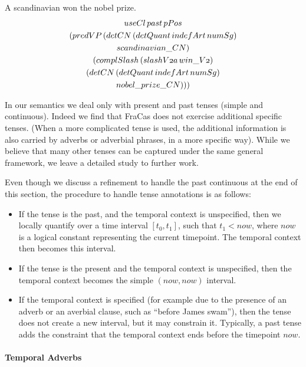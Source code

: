 \documentclass[a4paper,11pt]{article}
\newcommand\onelingex[1]{\begin{lingex}\item #1 \end{lingex}}
\begin{document}
\onelingex{A scandinavian won the nobel prize.\label{ex:nobel}
\\
{\small\begin{multline*}
\mathnormal{useCl}\, \mathnormal{past}\, \mathnormal{pPos}\\ (\mathnormal{predVP}\, (\mathnormal{detCN}\, (\mathnormal{detQuant}\, \mathnormal{indefArt}\, \mathnormal{numSg})\\ \mathnormal{scandinavian\_CN})\\ (\mathnormal{complSlash}\, (\mathnormal{slashV2a}\, \mathnormal{win\_V2})\\ (\mathnormal{detCN}\, (\mathnormal{detQuant}\, \mathnormal{indefArt}\, \mathnormal{numSg})\\ \mathnormal{nobel\_prize\_CN})))
\end{multline*}
}}
%
In our semantics we deal only with present and past tenses (simple and
continuous). Indeed we find that FraCas does not exercise additional
specific tenses. (When a more complicated tense is used, the
additional information is also carried by adverbs or adverbial
phrases, in a more specific way). While we believe that many other
tenses can be captured under the same general framework, we leave a
detailed study to further work.

Even though we discuss a refinement to handle the past continuous
at the end of this section, the procedure to handle tense annotations
is as follows:
\begin{itemize}
\item If the tense is the past, and the temporal context is
  unspecified, then we locally quantify over a time interval
  $[t_0,t_1]$, such that $t_1 < now$, where $now$ is a logical
  constant representing the current timepoint. The temporal context
  then becomes this interval.
\item If the tense is the present and the temporal context is
  unspecified, then the temporal context becomes the simple
  $(now,now)$ interval.
\item If the temporal context is specified (for example due to the presence of an adverb or an
  averbial clause, such as ``before James swam''), then the tense does
  not create a new interval, but it may constrain it. Typically, a
  past tense adds the constraint that the temporal context ends before
  the timepoint $now$.
\end{itemize}

\paragraph{Temporal Adverbs}
\end{document}
